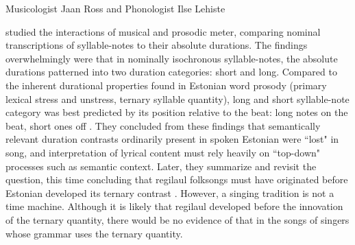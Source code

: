 

% 
%

%



Musicologist Jaan Ross and Phonologist Ilse Lehiste 

studied the interactions of musical and prosodic meter, comparing nominal transcriptions of syllable-notes to their absolute durations. The findings overwhelmingly were that in nominally isochronous syllable-notes, the absolute durations patterned into two duration categories: short and long. Compared to the inherent durational properties found in Estonian word prosody (primary lexical stress and unstress, ternary syllable quantity), long and short syllable-note category was best predicted by its position relative to the beat: long notes on the beat, short ones off \citep{rossLehiste1994, rossLehiste1996,rossLehiste1998}. They concluded from these findings that semantically relevant duration contrasts ordinarily present in spoken Estonian were ``lost" in song, and interpretation of lyrical content must rely heavily on ``top-down" processes such as semantic context. Later, they summarize and revisit the question, this time concluding that regilaul folksongs must have originated before Estonian developed its ternary contrast \citep{rossLehiste2001}. However, a singing tradition is not a time machine. Although it is likely that regilaul developed before the innovation of the ternary quantity, there would be no evidence of that in the songs of singers whose grammar uses the ternary quantity. 



